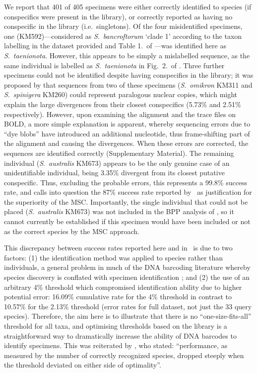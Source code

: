\documentclass[12pt]{article}
\begin{document}
We report that 401 of 405 specimens were either correctly identified to species (if conspecifics were present in the library), or correctly reported as having no conspecific in the library (i.e.\ singletons).  Of the four misidentified specimens, one (KM592)---considered as \emph{S}.\ \emph{bancroftorum} `clade 1' according to the taxon labelling in the dataset provided and Table 1.\ of \citeauthor{Dowton2014}---was identified here as \emph{S}.\ \emph{taenionota}. However, this appears to be simply a mislabelled sequence, as the same individual is labelled as  \emph{S}.\ \emph{taenionota} in Fig.\ 2.\ of \citet{Meiklejohn2013}. Three further specimens could not be identified despite having conspecifics in the library; it was proposed by \citet{Meiklejohn2012} that sequences from two of these specimens (\emph{S}.\ \emph{omikron} KM311 and  \emph{S}.\ \emph{spinigera} KM260) could represent paralogous nuclear copies, which might explain the large divergences from their closest conspecifics (5.73\% and 2.51\% respectively). However, upon examining the alignment and the trace files on BOLD, a more simple explanation is apparent, whereby sequencing errors due to ``dye blobs'' have introduced an additional nucleotide, thus frame-shifting part of the alignment and causing the divergences. When these errors are corrected, the sequences are identified correctly (Supplementary Material).  The remaining individual (\emph{S}.\ \emph{australis} KM673) appears to be the only genuine case of an unidentifiable individual, being 3.35\% divergent from its closest putative conspecific. Thus, excluding the probable errors, this represents a 99.8\% success rate, and calls into question the 87\% success rate reported by \citeauthor{Dowton2014}\ as justification for the superiority of the MSC. Importantly, the single individual that could not be placed (\emph{S}.\ \emph{australis} KM673) was not included in the BPP analysis of \citeauthor{Dowton2014}, so it cannot currently be established if this specimen would have been included or not as the correct species by the MSC approach. 

This discrepancy between success rates reported here and in \citeauthor{Dowton2014}\ is due to two factors: (1) the identification method was applied to species rather than individuals, a general problem in much of the DNA barcoding literature whereby species discovery is conflated with specimen identification \citep{Collins2013}; and (2) the use of an arbitrary 4\% threshold which compromised identification ability due to higher potential error: 16.09\% cumulative rate for the 4\% threshold in contrast to 10.57\% for the 2.13\% threshold (error rates for full dataset, not just the 33 query species). Therefore, the aim here is to illustrate that there is no ``one-size-fits-all'' threshold for all taxa, and optimising thresholds based on the library is a straightforward way to dramatically increase the ability of DNA barcodes to identify specimens. This was reiterated by \citet{Ratnasingham2013}, who stated: ``performance, as measured by the number of correctly recognized species, dropped steeply when the threshold deviated on either side of optimality''.
\end{document}
